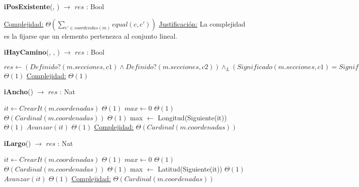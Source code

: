 \begin{Algoritmos}
\begin{algorithm}[H]{\textbf{iPosExistente}(, ) $\to$ $res$ : Bool}
\begin{algorithmic}[1]
			\medskip
			\Statex \underline{Complejidad:} $\Theta\left(\displaystyle\sum_{c' \in coordendas(m)}equal(c,c')\right)$
			\Statex \underline{Justificación:} La complejidad es la fijarse que un elemento pertenezca al conjunto lineal.
    	\end{algorithmic}
\end{algorithm}

\begin{algorithm}[H]{\textbf{iHayCamino}(, , ) $\to$ $res$ : Bool}
    	\begin{algorithmic}[1]
			\State $res \gets (Definido?(m.secciones, c1) \land Definido?(m.secciones, c2)) \land_L (Significado(m.secciones, c1) = Significado(m.secciones, c2))$ \Comment $\Theta(1)$
			\medskip
			\Statex \underline{Complejidad:} $\Theta(1)$
    	\end{algorithmic}
\end{algorithm}

\begin{algorithm}[H]{\textbf{iAncho}() $\to$ $res$ : Nat}
    	\begin{algorithmic}[1]
			\State $it \gets CrearIt(m.coordenadas)$ \Comment $\Theta(1)$
			\State $max \gets 0$ \Comment $\Theta(1)$
			 \Comment $\Theta(Cardinal(m.coordenadas))$
				 \Comment $\Theta(1)$
					\State max $\gets$ Longitud(Siguiente(it)) \Comment $\Theta(1)$	
				\EndIf
				\State $Avanzar(it)$ \Comment $\Theta(1)$				
			\EndWhile
			\medskip
			\Statex \underline{Complejidad:} $\Theta(Cardinal(m.coordenadas))$
    	\end{algorithmic}
\end{algorithm}

\begin{algorithm}[H]{\textbf{iLargo}() $\to$ $res$ : Nat}
    	\begin{algorithmic}[1]
			\State $it \gets CrearIt(m.coordenadas)$ \Comment $\Theta(1)$
			\State $max \gets 0$ \Comment $\Theta(1)$
			 \Comment $\Theta(Cardinal(m.coordenadas))$
				 \Comment $\Theta(1)$
					\State max $\gets$ Latitud(Siguiente(it)) \Comment $\Theta(1)$					
				\EndIf
				\State $Avanzar(it)$ \Comment $\Theta(1)$				
			\EndWhile
			\medskip
			\Statex \underline{Complejidad:} $\Theta(Cardinal(m.coordenadas))$
    	\end{algorithmic}
\end{algorithm}

\end{Algoritmos}
